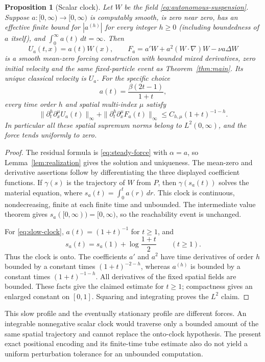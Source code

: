 \documentclass[11pt]{article}
\newtheorem{proposition}[theorem]{Proposition}
\theoremstyle{remark}\newtheorem{remark}[theorem]{Remark}
\begin{document}
\begin{proposition}[Scalar clock]\label{prop:scalar-clock}
Let $W$ be the field \eqref{eq:autonomous-suspension}. Suppose
$a:[0,\infty)\to[0,\infty)$ is computably smooth, is zero near zero,
has an effective finite bound for $|a^{(h)}|$ for every integer
$h\ge0$ (including boundedness of $a$ itself), and
$\int_0^\infty a(t)\,dt=\infty$. Then
\[
 U_a(t,x)=a(t)W(x),\qquad
 F_a=a'W+a^2(W\cdot\nabla)W-\nu a\Delta W
\]
is a smooth mean-zero forcing construction with bounded mixed derivatives,
zero initial velocity and the same fixed-particle event as
Theorem~\ref{thm:main}. Its unique classical velocity is $U_a$.
For the specific choice
\begin{equation}\label{eq:slow-clock}
 a(t)=\frac{\beta(2t-1)}{1+t},
\end{equation}
every time order $h$ and spatial multi-index $\mu$ satisfy
\[
 \|\partial_t^h\partial_x^\mu U_a(t)\|_\infty+
 \|\partial_t^h\partial_x^\mu F_a(t)\|_\infty
 \le C_{h,\mu}(1+t)^{-1-h}.
\]
In particular all these spatial supremum norms belong to
$L^2(0,\infty)$, and the force tends uniformly to zero.
\end{proposition}
\begin{proof}
The residual formula is \eqref{eq:steady-force} with $\alpha=a$,
so Lemma~\ref{lem:realization} gives the solution and uniqueness.
The mean-zero and derivative assertions follow by differentiating the
three displayed coefficient functions. If $\gamma(s)$ is the trajectory
of $W$ from $P$, then $\gamma(s_a(t))$ solves the material equation,
where $s_a(t)=\int_0^t a(r)\,dr$. This clock is continuous,
nondecreasing, finite at each finite time and unbounded. The intermediate
value theorem gives $s_a([0,\infty))=[0,\infty)$, so the reachability
event is unchanged.

For \eqref{eq:slow-clock}, $a(t)=(1+t)^{-1}$ for $t\ge1$, and
\[
 s_a(t)=s_a(1)+\log\frac{1+t}{2}\qquad(t\ge1).
\]
Thus the clock is onto. The coefficients $a'$ and $a^2$ have time
derivatives of order $h$ bounded by a constant times $(1+t)^{-2-h}$,
whereas $a^{(h)}$ is bounded by a constant times $(1+t)^{-1-h}$.
All derivatives of the fixed spatial fields are bounded. These facts
give the claimed estimate for $t\ge1$; compactness gives an enlarged
constant on $[0,1]$. Squaring and integrating proves the $L^2$ claim.
\end{proof}

This slow profile and the eventually stationary profile are different
forces. An integrable nonnegative scalar clock would traverse only a
bounded amount of the same spatial trajectory and cannot replace the
onto-clock hypothesis. The present exact positional encoding and its
finite-time tube estimate also do not yield a uniform perturbation
tolerance for an unbounded computation.
\end{document}
